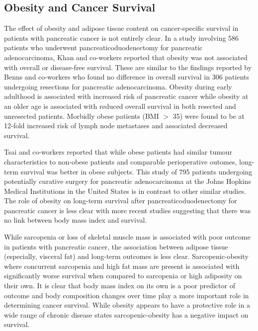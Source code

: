 \subsection{Obesity and Cancer Survival}

The effect of obesity and adipose tissue content on cancer-specific survival in patients with pancreatic cancer is not entirely clear. In a study involving 586 patients who underwent pancreaticoduodenectomy for pancreatic adenocarcinoma, Khan and co-workers reported that obesity was not associated with overall or disease-free survival. \parencite{khan_does_2010} These are similar to the findings reported by Benns and co-workers who found no difference in overall survival in 306 patients undergoing resections for pancreatic adenocarcinoma. \parencite{benns_impact_2009} Obesity during early adulthood is associated with increased risk of pancreatic cancer while obesity at an older age is associated with reduced overall survival in both resected and unresected patients. \parencite{li_body_2009} Morbidly obese patients (BMI $>$ 35) were found to be at 12-fold increased risk of lymph node metastases and associated decreased survival. \parencite{fleming_influence_2009}

Tsai and co-workers reported that while obese patients had similar tumour characteristics to non-obese patients and comparable perioperative outomes, long-term survival was better in obese subjects. \parencite{tsai_impact_2010}  This study of 795 patients undergoing potentially curative surgery for pancreatic adenocarcinoma at the Johns Hopkins Medical Institutions in the United States is in contrast to other similar studies. The role of obesity on long-term survival after pancreaticoduodenectomy for pancreatic cancer is less clear with more recent studies suggesting that there was no link between body mass index and survival. \parencite{dandona_influence_2011, benns_impact_2009}

While sarcopenia or loss of skeletal muscle mass is associated with poor outcome in patients with pancreatic cancer, the association between adipose tissue (especially, visceral fat) and long-term outcomes is less clear. Sarcopenic-obesity where concurrent sarcopenia and high fat mass are present is associated with significantly worse survival when compared to sarcopenia or high adiposity on their own. \parencite{tan_sarcopenia_2009} It is clear that body mass index on its own is a poor predictor of outcome and body composition changes over time play a more important role in determining cancer survival. While obesity appears to have a protective role in a wide range of chronic disease states\parencite{kalantar-zadeh_risk_2007, amundson_obesity_2010, myers_obesity_2011} sarcopenic-obesity has a negative impact on survival. \parencite{tan_sarcopenia_2009}

